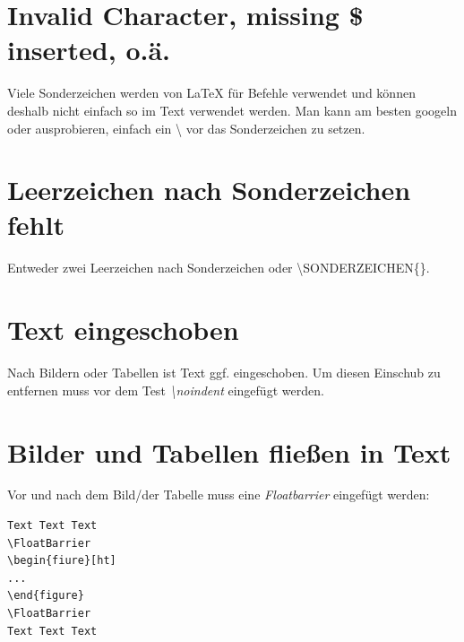 \documentclass[12pt]{article}
\begin{document}
\section{Invalid Character, missing \$ inserted, o.ä.}
Viele Sonderzeichen werden von LaTeX für Befehle verwendet und können deshalb nicht einfach so im Text verwendet werden. Man kann am besten googeln oder ausprobieren, einfach ein \textbackslash{} vor das Sonderzeichen zu setzen.

\section{Leerzeichen nach Sonderzeichen fehlt}
Entweder zwei Leerzeichen nach Sonderzeichen oder \textbackslash SONDERZEICHEN\{\}.

\section{Text eingeschoben}
Nach Bildern oder Tabellen ist Text ggf. eingeschoben. Um diesen Einschub zu entfernen muss vor dem Test \textit{\textbackslash noindent} eingefügt werden.

\section{Bilder und Tabellen fließen in Text}
Vor und nach dem Bild/der Tabelle muss eine \textit{Floatbarrier} eingefügt werden:
\begin{verbatim}
Text Text Text
\FloatBarrier
\begin{fiure}[ht]
...
\end{figure}
\FloatBarrier
Text Text Text
\end{verbatim}


    \clearpage
    \frontmatter%
    \renewcommand{\plaintitle}{Literaturverzeichnis}
    \setcounter{page}{5}
    \printMyBibliography
    \clearpage
    \renewcommand{\plaintitle}{Anhang}
    {\def\makebox[#1][#2]#3{#3}%
        \listofanhang
    }
\end{document}
